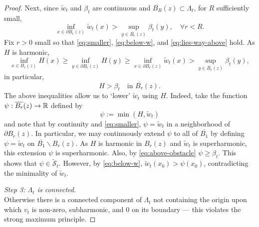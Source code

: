 \documentclass[12pt]{amsart}
\numberwithin{equation}{section}
\newcommand{\mclSshift}[2]{\hyperref[eq:shifted-supersolutions]{\mathcal{\tilde{S}}^{#1}_{#2}}}
\newcommand{\lssshift}[2]{\hyperref[eq:appendix-least-supersolution]{\tilde{w}^{#1}_{#2}}}
\newcommand{\cluster}[2]{\hyperref[eq:non-co-set]{\mathit{\Lambda}^{#1}_{#2}}}
\newcommand{\odometer}[2]{\hyperref[eq:limit-odometer]{v^{#1}_{#2}}}
\begin{document}
\begin{proof}
		Next, since $\lssshift{}{t}$ and $\beta_t$ are continuous and $\overline{B_R}(z) \subset {\cluster{}{t}}$, for $R$ sufficiently small,
		\begin{equation} \label{eq:lies-way-above}
		\inf_{x \in \partial B_r(z)} \lssshift{}{t}(x) > \sup_{y \in \overline{B_r}(z)} \beta_t(y), \quad\forall r < R .
		\end{equation} 
		Fix $r > 0$ small so that \eqref{eq:smaller}, \eqref{eq:below-w}, and \eqref{eq:lies-way-above} hold.  As $H$ is harmonic, 
		\[
		\inf_{x \in B_r(z)} H(x) \geq \inf_{y \in \partial B_r(z)} H(y) \geq  \inf_{x \in \partial B_r(z)} \lssshift{}{t}(x) > \sup_{y \in \overline{B_r}(z)} \beta_t(y),
		\]
		in particular,
		\begin{equation} \label{eq:above-obstacle}
		H > \beta_t \quad \mbox{in $\overline{B_r}(z)$}. 
		\end{equation}
		The above inequalities allow us to `lower' $\lssshift{}{t}$ using $H$.  Indeed, take the function $\psi: \overline{B_r}(z) \to \mathbb{R}$ defined by
		\begin{equation}
		\psi := \min(H, \lssshift{}{t}) 
		\end{equation}
		and note that by continuity and \eqref{eq:smaller}, $\psi = \lssshift{}{t}$ in a neighborhood of $\partial B_r(z)$. In particular, 
		we may continuously extend $\psi$ to all of $\overline{B_1}$ by defining $\psi = \lssshift{}{t}$ on $\overline{B_1} \backslash B_r(z)$.
		As $H$ is harmonic in $B_r(z)$ and $\lssshift{}{t}$ is superharmonic, this extension $\psi$ is superharmonic. Also, by \eqref{eq:above-obstacle} $\psi \geq \beta_t$. 
		This shows that $\psi \in \mclSshift{}{t}$. However, by \eqref{eq:below-w},  $\lssshift{}{t}(x_0) > \psi(x_0)$, 
		contradicting the minimality of $\lssshift{}{t}$. 
		
		{\it Step 3: ${\cluster{}{t}}$ is connected.} \\
		Otherwise there is a connected component of ${\cluster{}{t}}$ not containing the origin
		upon which $\odometer{}{t}$ is non-zero, subharmonic, and 0 on its boundary --- this violates the strong maximum principle.
	\end{proof}
	
\end{document}
